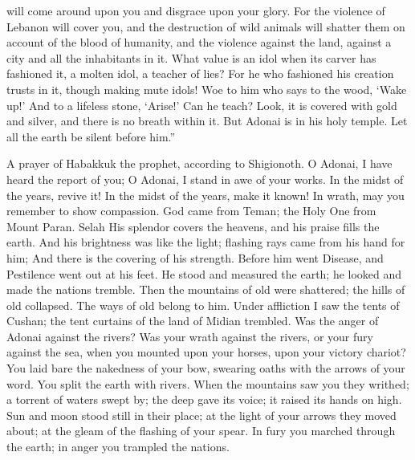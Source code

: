 \begin{biblechapter}
will come around upon you 
and disgrace upon your glory.
\verse For the violence of Lebanon will cover you, 
and the destruction of wild animals will shatter them 
on account of the blood of humanity, 
and the violence against the land, 
against a city and all the inhabitants in it.
\verse What value is an idol 
when its carver has fashioned it, 
a molten idol, a teacher of lies? 
For he who fashioned his creation trusts in it, 
though making mute idols!
\verse Woe to him who says to the wood, ‘Wake up!’ 
And to a lifeless stone, ‘Arise!’ 
Can he teach? 
Look, it is covered with gold and silver, 
and there is no breath within it.
\verse But Adonai is in his holy temple. 
Let all the earth be silent before him.”
\end{biblechapter}

\begin{biblechapter} %
 A prayer of Habakkuk the prophet, according to Shigionoth.
\verse O Adonai, I have heard the report of you; 
O Adonai, I stand in awe of your works. 
In the midst of the years, revive it! 
In the midst of the years, make it known! 
In wrath, may you remember to show compassion.
\verse God came from Teman; 
the Holy One from Mount Paran. Selah 
His splendor covers the heavens, 
and his praise fills the earth.
\verse And his brightness was like the light; 
flashing rays came from his hand for him; 
And there is the covering of his strength.
\verse Before him went Disease, 
and Pestilence went out at his feet.
\verse He stood and measured the earth; 
he looked and made the nations tremble. 
Then the mountains of old were shattered; 
the hills of old collapsed. 
The ways of old belong to him.
\verse Under affliction I saw the tents of Cushan; 
the tent curtains of the land of Midian trembled.
\verse Was the anger of Adonai against the rivers? 
Was your wrath against the rivers, 
or your fury against the sea, 
when you mounted upon your horses, 
upon your victory chariot?
\verse You laid bare the nakedness of your bow, 
swearing oaths with the arrows of your word. 
You split the earth with rivers.
\verse When the mountains saw you they writhed; 
a torrent of waters swept by; 
the deep gave its voice; 
it raised its hands on high.
\verse Sun and moon stood still in their place; 
at the light of your arrows they moved about; 
at the gleam of the flashing of your spear.
\verse In fury you marched through the earth; 
in anger you trampled the nations.

\end{biblechapter}
